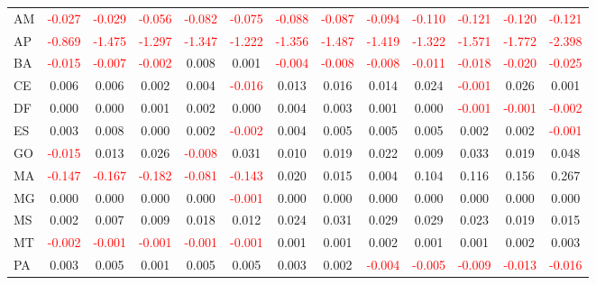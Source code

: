 \documentclass[a4paper, 12pt]{article}
\begin{document}
\begin{table}[H]
{\begin{tabular}{lcccccccccccc}
      AM & \textcolor{red}{-0.027} & \textcolor{red}{-0.029} & \textcolor{red}{-0.056} & \textcolor{red}{-0.082} & \textcolor{red}{-0.075} & \textcolor{red}{-0.088} & \textcolor{red}{-0.087} & \textcolor{red}{-0.094} & \textcolor{red}{-0.110} & \textcolor{red}{-0.121} & \textcolor{red}{-0.120} & \textcolor{red}{-0.121}\\
      AP & \textcolor{red}{-0.869} & \textcolor{red}{-1.475} & \textcolor{red}{-1.297} & \textcolor{red}{-1.347} & \textcolor{red}{-1.222} & \textcolor{red}{-1.356} & \textcolor{red}{-1.487} & \textcolor{red}{-1.419} & \textcolor{red}{-1.322} & \textcolor{red}{-1.571} & \textcolor{red}{-1.772} & \textcolor{red}{-2.398}\\
      BA & \textcolor{red}{-0.015} & \textcolor{red}{-0.007} & \textcolor{red}{-0.002} & 0.008 & 0.001 & \textcolor{red}{-0.004} & \textcolor{red}{-0.008} & \textcolor{red}{-0.008} & \textcolor{red}{-0.011} & \textcolor{red}{-0.018} & \textcolor{red}{-0.020} & \textcolor{red}{-0.025}\\
      CE & 0.006 & 0.006 & 0.002 & 0.004 & \textcolor{red}{-0.016} & 0.013 & 0.016 & 0.014 & 0.024 & \textcolor{red}{-0.001} & 0.026 & 0.001\\
      DF & 0.000 & 0.000 & 0.001 & 0.002 & 0.000 & 0.004 & 0.003 & 0.001 & 0.000 & \textcolor{red}{-0.001} & \textcolor{red}{-0.001} & \textcolor{red}{-0.002}\\
      ES & 0.003 & 0.008 & 0.000 & 0.002 & \textcolor{red}{-0.002} & 0.004 & 0.005 & 0.005 & 0.005 & 0.002 & 0.002 & \textcolor{red}{-0.001}\\
      GO & \textcolor{red}{-0.015} & 0.013 & 0.026 & \textcolor{red}{-0.008} & 0.031 & 0.010 & 0.019 & 0.022 & 0.009 & 0.033 & 0.019 & 0.048\\
      MA & \textcolor{red}{-0.147} & \textcolor{red}{-0.167} & \textcolor{red}{-0.182} & \textcolor{red}{-0.081} & \textcolor{red}{-0.143} & 0.020 & 0.015 & 0.004 & 0.104 & 0.116 & 0.156 & 0.267\\
      MG & 0.000 & 0.000 & 0.000 & 0.000 & \textcolor{red}{-0.001} & 0.000 & 0.000 & 0.000 & 0.000 & 0.000 & 0.000 & 0.000\\
      MS & 0.002 & 0.007 & 0.009 & 0.018 & 0.012 & 0.024 & 0.031 & 0.029 & 0.029 & 0.023 & 0.019 & 0.015\\
      MT & \textcolor{red}{-0.002} & \textcolor{red}{-0.001} & \textcolor{red}{-0.001} & \textcolor{red}{-0.001} & \textcolor{red}{-0.001} & 0.001 & 0.001 & 0.002 & 0.001 & 0.001 & 0.002 & 0.003\\
      PA & 0.003 & 0.005 & 0.001 & 0.005 & 0.005 & 0.003 & 0.002 & \textcolor{red}{-0.004} & \textcolor{red}{-0.005} & \textcolor{red}{-0.009} & \textcolor{red}{-0.013} & \textcolor{red}{-0.016}\\

\end{tabular}}
\end{table}
\end{document}
